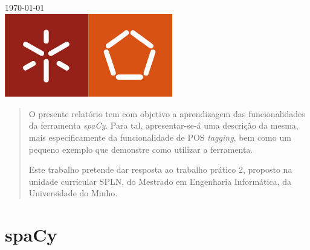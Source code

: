 \documentclass[12pt]{article}
\begin{document}
\begin{titlepage}
{\large \today}\\[1.5cm] %


\includegraphics[width=0.55\textwidth]{logo}\\[1cm] %
 

\vfill %

\end{titlepage}

\vspace{0.5cm}

\begin{abstract}
O presente relatório tem com objetivo a aprendizagem das funcionalidades da ferramenta \textit{spaCy}. Para tal, apresentar-se-á uma descrição da mesma, mais especificamente da
funcionalidade de POS \textit{tagging}, bem como um pequeno exemplo que demonstre como utilizar a ferramenta.

Este trabalho pretende dar resposta ao trabalho prático 2, proposto na unidade curricular SPLN, do Mestrado em Engenharia Informática, da Universidade do Minho.
\end{abstract}

\vspace{0.5cm}

\tableofcontents

\newpage

\let\oldref\ref
\renewcommand{\ref}[1]{\smash{\underline{\oldref{#1}}}}

\section{spaCy}
\end{document}
